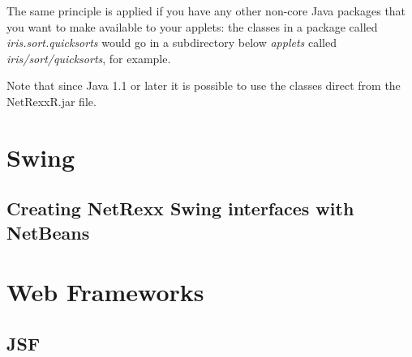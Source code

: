 The same principle is applied if you have any other non-core Java
packages that you want to make available to your applets: the classes in
a package called \emph{iris.sort.quicksorts} would go in a subdirectory
below \emph{applets} called \emph{iris/sort/quicksorts}, for example.

Note that since Java 1.1 or later it is possible to use the
classes direct from the NetRexxR.jar file.

\section{Swing}
\subsection{Creating NetRexx Swing interfaces with NetBeans}
\section{Web Frameworks}
\subsection{JSF}
